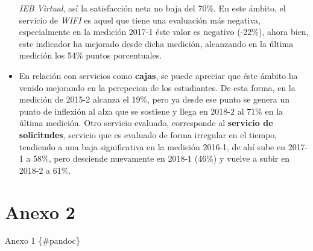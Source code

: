 \documentclass[]{book}
\begin{document}
\begin{itemize}
  \emph{IEB Virtual}, así la satisfacción neta no baja del 70\%. En este
  ámbito, el servicio de \emph{WIFI} es aquel que tiene una evaluación
  más negativa, especialmente en la medición 2017-1 éste valor es
  negativo (-22\%), ahora bien, este indicador ha mejorado desde dicha
  medición, alcanzando en la última medición los 54\% puntos
  porcentuales.
\item
  En relación con servicios como \textbf{cajas}, se puede apreciar que
  éste ámbito ha venido mejorando en la percpecion de los estudiantes.
  De esta forma, en la medición de 2015-2 alcanza el 19\%, pero ya desde
  ese punto se genera un punto de inflexión al alza que se sostiene y
  llega en 2018-2 al 71\% en la última medición. Otro servicio evaluado,
  corresponde al \textbf{servicio de solicitudes}, servicio que es
  evaluado de forma irregular en el tiempo, tendiendo a una baja
  significativa en la medición 2016-1, de ahí sube en 2017-1 a 58\%,
  pero desciende nuevamente en 2018-1 (46\%) y vuelve a subir en 2018-2
  a 61\%.
\end{itemize}

\appendix


\chapter{Anexo 2}\label{rmarkdown}

Anexo 1 \{\#pandoc\}


\end{document}
